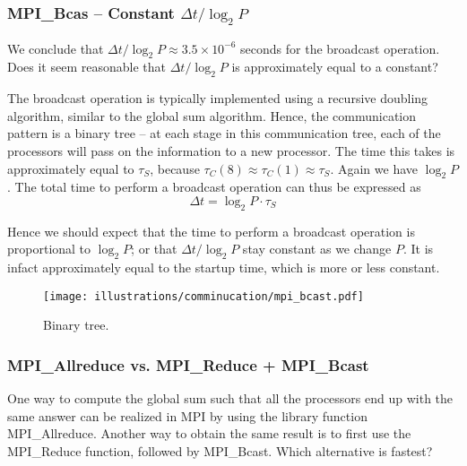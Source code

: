 \subsubsection{MPI\_Bcas -- Constant $\Delta t/\log_2 P$} %
\label{ssub:constant_delta_t_log_2_p_}

\begin{question}
  We conclude that $\Delta t/\log_2 P \approx 3.5 \times 10^{-6}$ seconds for the broadcast operation. Does it seem reasonable that $\Delta t/\log_2 P$ is approximately equal to a constant?
\end{question}

The broadcast operation is typically implemented using a recursive doubling algorithm, similar to the global sum algorithm. Hence, the communication pattern is a binary tree -- at each stage in this communication tree, each of the processors will pass on the information to a new processor. The time this takes is approximately equal to $\tau_S$, because $\tau_C(8) \approx \tau_C(1) \approx \tau_S$. Again we have $\log_2 P$. The total time to perform a broadcast operation can thus be expressed as
\begin{equation}
  \Delta t = \log_2 P \cdot\tau_S
\end{equation}

Hence we should expect that the time to perform a broadcast operation is proportional to $\log_2 P$; or that $\Delta t/\log_2 P$ stay constant as we change $P$. It is infact approximately equal to the startup time, which is more or less constant.

\begin{figure}[H]
  \centering
  \texttt{[image: illustrations/comminucation/mpi\_bcast.pdf]}
  \caption{Binary tree.}
  \label{fig:label}
\end{figure}


\subsubsection{MPI\_Allreduce vs. MPI\_Reduce + MPI\_Bcast} %
\label{ssub:mpi_allreduce_vs_mpi_reduce_mpi_bcast}

\begin{question}
  One way to compute the global sum such that all the processors end up with the same answer can be realized in MPI by using the library function MPI\_Allreduce. Another way to obtain the same result is to first use the MPI\_Reduce function, followed by MPI\_Bcast. Which alternative is fastest?
\end{question}

